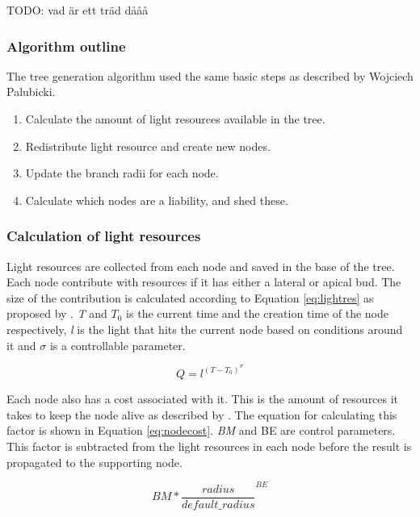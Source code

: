 \documentclass{article}
\begin{document}
  			TODO: vad är ett träd dååå
  			
  			\subsubsection*{Algorithm outline}
  			
  			The tree generation algorithm used the same basic steps as described by Wojciech Palubicki. \citep{palubicki2009self}
  			
  			\begin{enumerate}
  				\item Calculate the amount of light resources available in the tree.
  				\item Redistribute light resource and create new nodes.
  				\item Update the branch radii for each node.
  				\item Calculate which nodes are a liability, and shed these.
  			\end{enumerate}
  		
  			\subsubsection*{Calculation of light resources}
  			
  				Light resources are collected from each node and saved in the base of the tree. Each node contribute with resources if it has either a lateral or apical bud. The size of the contribution is calculated according to Equation \ref{eq:lightres} as proposed by \cite{yi2018tree}. \textit{T} and \textit{$T_0$} is the current time and the creation time of the node respectively, \textit{l} is the light that hits the current node based on conditions around it and $\sigma$ is a controllable parameter.
  				
  				\begin{equation}
  					\label{eq:lightres}
  					Q = l^{{(T-T_0)}^\sigma}
  				\end{equation}
  				
  				Each node also has a cost associated with it. This is the amount of resources it takes to keep the node alive as described by \cite{mvech1996visual}. The equation for calculating this factor is shown in Equation \ref{eq:nodecost}. \textit{BM} and BE are control parameters. This factor is subtracted from the light resources in each node before the result is propagated to the supporting node. 
  				
  				\begin{equation}
  					\label{eq:nodecost}
  					BM * {\frac{radius}{default\_radius}}^{BE}
  				\end{equation}
  				
\end{document}

